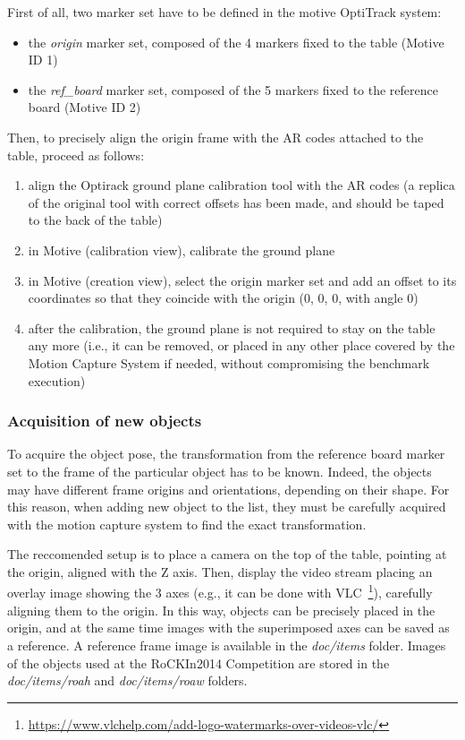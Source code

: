 \documentclass[a4paper]{article}
\newcommand{\ro}{RoCKIn}
\begin{document}
First of all, two marker set have to be defined in the motive OptiTrack system:
\begin{itemize}
  \item the \emph{origin} marker set, composed of the 4 markers fixed to the table (Motive ID 1)
  \item the \emph{ref\_board} marker set, composed of the 5 markers fixed to the reference board (Motive ID 2)
\end{itemize}

Then, to precisely align the origin frame with the AR codes attached to the table, proceed as follows:
\begin{enumerate}
  \item align the Optirack ground plane calibration tool with the AR codes (a replica of the original tool with correct offsets has been made, and should be taped to the back of the table)
  \item in Motive (calibration view), calibrate the ground plane
  \item in Motive (creation view), select the origin marker set and add an offset to its coordinates so that they coincide with the origin (0, 0, 0, with angle 0)
  \item after the calibration, the ground plane is not required to stay on the table any more (i.e., it can be removed, or placed in any other place covered by the Motion Capture System if needed, without compromising the benchmark execution)
  
\end{enumerate}

\subsubsection{Acquisition of new objects}
\label{sec:acquire_items}

To acquire the object pose, the transformation from the reference board marker set to the frame of the particular object has to be known.
Indeed, the objects may have different frame origins and orientations, depending on their shape.
For this reason, when adding new object to the list, they must be carefully acquired with the motion capture system to find the exact transformation.

The reccomended setup is to place a camera on the top of the table, pointing at the origin, aligned with the Z axis.
Then, display the video stream placing an overlay image showing the 3 axes (e.g., it can be done with VLC~\footnote{\url{https://www.vlchelp.com/add-logo-watermarks-over-videos-vlc/}}), carefully aligning them to the origin.
In this way, objects can be precisely placed in the origin, and at the same time images with the superimposed axes can be saved as a reference.
A reference frame image is available in the \emph{doc/items} folder.
Images of the objects used at the \ro 2014 Competition are stored in the \emph{doc/items/roah} and \emph{doc/items/roaw} folders.
\end{document}
